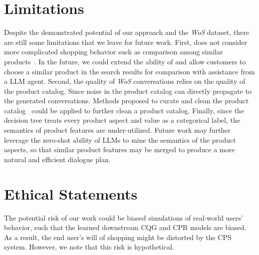 \section*{Limitations}
Despite the demonstrated potential of our \method approach and the \textit{WoS} dataset, there are still some limitations that we leave for future work. %
First, \method does not consider more complicated shopping behavior such as comparison among similar products~\cite{vedula2022matters}. %
In the future, we could extend the ability of \method and allow customers to choose a similar product in the search results for comparison with assistance from a LLM agent. 
Second, the quality of \textit{WoS} conversations relies on the quality of the product catalog. Since noise in the product catalog can directly propagate to the generated conversations. Methods proposed to curate and clean the product catalog~\cite{ghani2006text,yang2022mave,vedula2022matters} could be applied to further clean a product catalog. %
Finally, since the decision tree treats every product aspect and value as a categorical label, the semantics of product features are under-utilized. Future work may further leverage the zero-shot ability of LLMs to mine the semantics of the product aspects, so that similar product features may be merged to produce a more natural and efficient dialogue plan.

\section*{Ethical Statements}
The potential risk of our work could be biased simulations of real-world users' behavior, such that the learned downstream CQG and CPR models are biased. As a result, the end user's will of shopping might be distorted by the CPS system. However, we note that this risk is hypothetical.